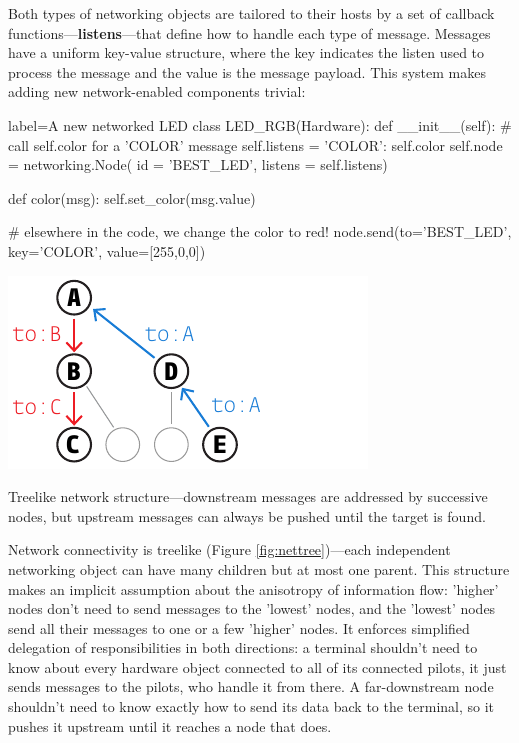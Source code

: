Both types of networking objects are tailored to their hosts by a set of callback functions---\textbf{listens}---that define how to handle each type of message. Messages have a uniform key-value structure, where the key indicates the listen used to process the message and the value is the message payload. This system makes adding new network-enabled components trivial:

\begin{pythoncode*}{label=A new networked LED}
class LED_RGB(Hardware):
    def __init__(self):
        # call self.color for a 'COLOR' message
        self.listens = {'COLOR': self.color}
        self.node = networking.Node(
            id      = 'BEST_LED',
            listens = self.listens)
        
    def color(msg):
        self.set_color(msg.value)
        
# elsewhere in the code, we change the color to red!
node.send(to='BEST_LED', key='COLOR', value=[255,0,0])
\end{pythoncode*}

\begin{marginfigure}[2.4cm]
\includegraphics[]{figures/side_25_tree.pdf}
\caption{Treelike network structure---downstream messages are addressed by successive nodes, but upstream messages can always be pushed until the target is found.}
\label{fig:nettree}
\end{marginfigure}

Network connectivity is treelike (Figure \ref{fig:nettree})---each independent networking object can have many children but at most one parent. This structure makes an implicit assumption about the anisotropy of information flow: 'higher' nodes don't need to send messages to the 'lowest' nodes, and the 'lowest' nodes send all their messages to one or a few 'higher' nodes. It enforces simplified delegation of responsibilities in both directions: a terminal shouldn't need to know about every hardware object connected to all of its connected pilots, it just sends messages to the pilots, who handle it from there. A far-downstream node shouldn't need to know exactly how to send its data back to the terminal, so it pushes it upstream until it reaches a node that does.
